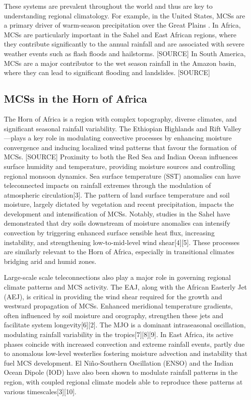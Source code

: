 These systems are prevalent throughout the world and thus are key to understanding regional climatology. For example, in the United States, MCSs are a primary driver of warm-season precipitation over the Great Plains \cite{Haberlie2019}. In Africa, MCSs are particularly important in the Sahel and East African regions, where they contribute significantly to the annual rainfall and are associated with severe weather events such as flash floods and hailstorms. [SOURCE] In South America, MCSs are a major contributor to the wet season rainfall in the Amazon basin, where they can lead to significant flooding and landslides. [SOURCE]

\subsection{MCSs in the Horn of Africa}

The Horn of Africa is a region with complex topography, diverse climates, and significant seasonal rainfall variability. The Ethiopian Highlands and Rift Valley—plays a key role in modulating convective processes by enhancing moisture convergence and inducing localized wind patterns that favour the formation of MCSs. [SOURCE] Proximity to both the Red Sea and Indian Ocean influences surface humidity and temperature, providing moisture sources and controlling regional monsoon dynamics. Sea surface temperature (SST) anomalies can have teleconnected impacts on rainfall extremes through the modulation of atmospheric circulation[3]. The pattern of land surface temperature and soil moisture, largely dictated by vegetation and recent precipitation, impacts the development and intensification of MCSs. Notably, studies in the Sahel have demonstrated that dry soils downstream of moisture anomalies can intensify convection by triggering enhanced surface sensible heat flux, increasing instability, and strengthening low-to-mid-level wind shear[4][5]. These processes are similarly relevant to the Horn of Africa, especially in transitional climates bridging arid and humid zones.

Large-scale scale teleconnections also play a major role in governing regional climate patterns and MCS activity. The EAJ, along with the African Easterly Jet (AEJ), is critical in providing the wind shear required for the growth and westward propagation of MCSs. Enhanced meridional temperature gradients, often influenced by soil moisture and orography, strengthen these jets and facilitate system longevity[6][2]. The MJO is a dominant intraseasonal oscillation, modulating rainfall variability in the tropics[7][8][9]. In East Africa, its active phases coincide with increased convection and extreme rainfall events, partly due to anomalous low-level westerlies fostering moisture advection and instability that fuel MCS development. El Niño-Southern Oscillation (ENSO) and the Indian Ocean Dipole (IOD) have also been shown to modulate rainfall patterns in the region, with coupled regional climate models able to reproduce these patterns at various timescales[3][10].

